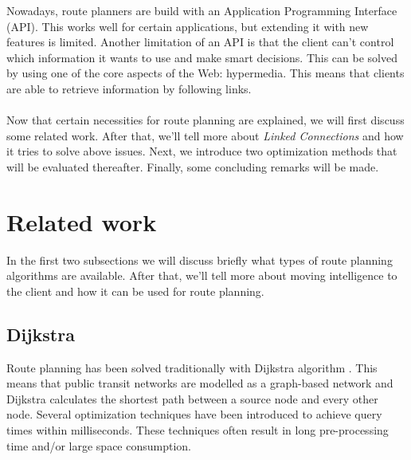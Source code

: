\documentclass[twocolumn]{phdsymp} %
\begin{document}
Nowadays, route planners are build with an Application Programming Interface (API). This works well for certain applications, but extending it with new features is limited.
Another limitation of an API is that the client can't control which information it wants to use and make smart decisions. This can be solved by using one of the core aspects of the Web: hypermedia. This means that clients are able to retrieve information by following links.
\\~\\
Now that certain necessities for route planning are explained, we will first discuss some related work. After that, we'll tell more about \textit{Linked Connections} and how it tries to solve above issues. Next, we introduce two optimization methods that will be evaluated thereafter. Finally, some concluding remarks will be made.

\section{Related work}
In the first two subsections we will discuss briefly what types of route planning algorithms are available. After that, we'll tell more about moving intelligence to the client and how it can be used for route planning.

\subsection{Dijkstra}
Route planning has been solved traditionally with Dijkstra algorithm \cite{raptor}. This means that public transit networks are modelled as a graph-based network and Dijkstra calculates the shortest path between a source node and every other node. Several optimization techniques have been introduced to achieve query times within milliseconds\cite{scalable-transfer-patterns}. These techniques often result in long pre-processing time and/or large space consumption.
\end{document}

